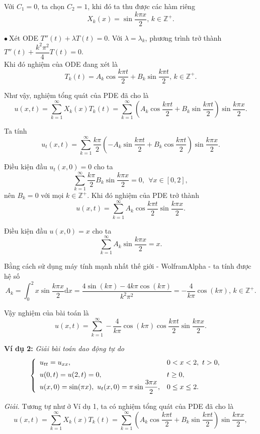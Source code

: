 \documentclass[10pt, a4paper]{article}
\begin{document}
	Với $C_1=0$, ta chọn $C_2=1$, khi đó ta thu được các hàm riêng $$X_k(x)=\sin\frac{k\pi x}{2},\,k\in\mathbb Z^+.$$
	
	$\bullet~$Xét ODE $T''(t)+\lambda T(t)=0$. Với $\lambda=\lambda_k$, phương trình trở thành $T''(t)+\dfrac{k^2\pi^2}{4}T(t)=0$.\\
	
	Khi đó nghiệm của ODE đang xét là $$T_k(t)=A_k\cos\frac{k\pi t}{2}+B_k\sin\frac{k\pi t}{2},\,k\in\mathbb Z^+.$$
	
	Như vậy, nghiệm tổng quát của PDE đã cho là $$u(x,t)=\sum_{k=1}^\infty X_k(x)T_k(t)=\sum_{k=1}^\infty\left(A_k\cos\frac{k\pi t}{2}+B_k\sin\frac{k\pi t}{2}\right)\sin\frac{k\pi x}{2}.$$
	
	Ta tính $$u_t(x,t)=\sum_{k=1}^\infty\frac{k\pi}{2}\left(-A_k\sin\frac{k\pi t}{2}+B_k\cos\frac{k\pi t}{2}\right)\sin\frac{k\pi x}{2}.$$
	
	Điều kiện đầu $u_t(x,0)=0$ cho ta $$\sum_{k=1}^\infty \frac{k\pi}{2}B_k\sin\frac{k\pi x}{2}=0,~~\forall x\in[0,2],$$
	nên $B_k=0$ với mọi $k\in\mathbb Z^+$. Khi đó nghiệm của PDE trở thành $$u(x,t)=\sum_{k=1}^\infty A_k\cos\frac{k\pi t}{2}\sin\frac{k\pi x}{2}.$$
	
	Điều kiện đầu $u(x,0)=x$ cho ta $$\sum_{k=1}^\infty A_k\sin\frac{k\pi x}{2}=x.$$
	
	Bằng cách sử dụng máy tính mạnh nhất thế giới - WolframAlpha - ta tính được hệ số $$A_k=\int_0^2x\sin\frac{k\pi x}{2}\mathrm dx=\frac{4\sin(k\pi)-4k\pi\cos(k\pi)}{k^2\pi^2}=-\frac{4}{k\pi}\cos(k\pi),\,k\in\mathbb Z^+.$$
	
	Vậy nghiệm của bài toán là $$u(x,t)=\sum_{k=1}^\infty -\frac{4}{k\pi}\cos(k\pi)\cos\frac{k\pi t}{2}\sin\frac{k\pi x}{2}.$$
	
	\textbf{Ví dụ 2:} \textit{Giải bài toán dao động tự do} $$\begin{cases}
		\begin{array}{ll}
			u_{tt}=u_{xx}, & 0<x<2,~t>0,\\
			\noalign{\vskip3pt}
			u(0,t)=u(2,t)=0, & t\ge0,\\
			u(x,0)=\sin(\pi x),~u_t(x,0)=\pi\sin\dfrac{3\pi x}{2}, & 0\le x\le 2.
		\end{array}
	\end{cases}$$
	
	\textit{Giải.} Tương tự như ở Ví dụ 1, ta có nghiệm tổng quát của PDE đã cho là $$u(x,t)=\sum_{k=1}^\infty X_k(x)T_k(t)=\sum_{k=1}^\infty\left(A_k\cos\frac{k\pi t}{2}+B_k\sin\frac{k\pi t}{2}\right)\sin\frac{k\pi x}{2},$$
	
\end{document}
